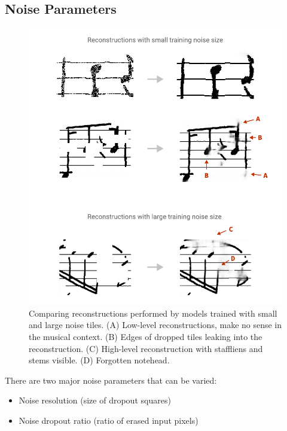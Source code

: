 \subsection{Noise Parameters}
\label{sec:NoiseParameters}

\begin{figure}[p]
    \centering
    \includegraphics[width=140mm]{../../figures/06-noise/noise-size.pdf}
    \caption{Comparing reconstructions performed by models trained with small and large noise tiles. (A) Low-level reconstructions, make no sense in the musical context. (B) Edges of dropped tiles leaking into the reconstruction. (C) High-level reconstruction with staffliens and stems visible. (D) Forgotten notehead.}
    \label{fig:NoiseSize}
\end{figure}

There are two major noise parameters that can be varied:

\begin{itemize}
    \item Noise resolution (size of dropout squares)
    \item Noise dropout ratio (ratio of erased input pixels)
\end{itemize}

